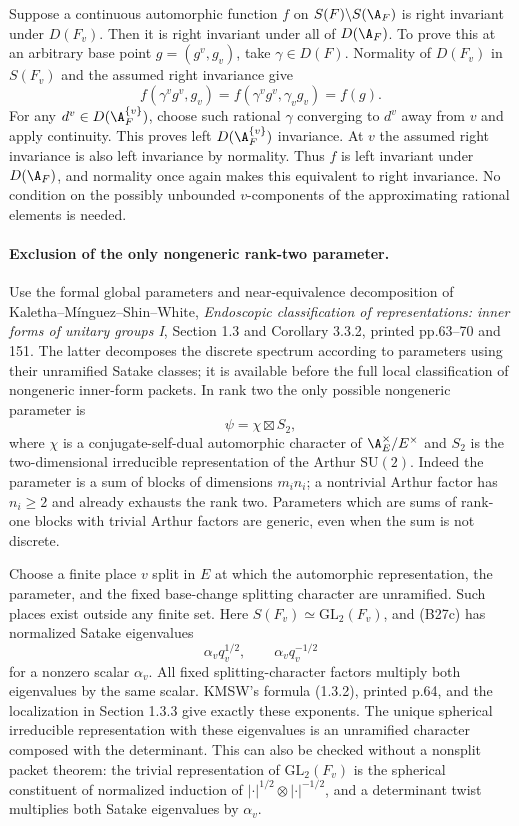 \documentclass[11pt]{article}
\theoremstyle{definition}\newtheorem{definition}[theorem]{Definition}\newtheorem{remark}[theorem]{Remark}
\begin{document}
Suppose a continuous automorphic function $f$ on $S(F)\backslash
S(\A_F)$ is right invariant under $D(F_v)$.  Then it is right
invariant under all of $D(\A_F)$.  To prove this at an arbitrary
base point $g=(g^v,g_v)$, take $\gamma\in D(F)$.  Normality of
$D(F_v)$ in $S(F_v)$ and the assumed right invariance give
\[
 f(\gamma^v g^v,g_v)
   =f(\gamma^v g^v,\gamma_v g_v)=f(g).
 \tag{B27b}
\]
For any $d^v\in D(\A_F^{\{v\}})$, choose such rational
$\gamma$ converging to $d^v$ away from $v$ and apply continuity.
This proves left $D(\A_F^{\{v\}})$ invariance.  At $v$ the
assumed right invariance is also left invariance by normality.
Thus $f$ is left invariant under $D(\A_F)$, and normality once
again makes this equivalent to right invariance.  No condition
on the possibly unbounded $v$-components of the approximating
rational elements is needed.

\paragraph{Exclusion of the only nongeneric rank-two parameter.}
Use the formal global parameters and near-equivalence decomposition
of Kaletha--M\'inguez--Shin--White, \emph{Endoscopic classification
of representations: inner forms of unitary groups I},
Section 1.3 and Corollary 3.3.2, printed pp.63--70 and 151.
The latter decomposes the discrete spectrum according to
parameters using their unramified Satake classes; it is available
before the full local classification of nongeneric inner-form
packets.  In rank two the only possible nongeneric parameter is
\[
                         \psi=\chi\boxtimes S_2,
 \tag{B27c}
\]
where $\chi$ is a conjugate-self-dual automorphic character of
$\A_E^\times/E^\times$ and $S_2$ is the two-dimensional
irreducible representation of the Arthur $\mathrm{SU}(2)$.
Indeed the parameter is a sum of blocks of dimensions
$m_i n_i$; a nontrivial Arthur factor has $n_i\ge2$ and
already exhausts the rank two.  Parameters which are sums
of rank-one blocks with trivial Arthur factors are generic,
even when the sum is not discrete.

Choose a finite place $v$ split in $E$ at which the automorphic
representation, the parameter, and the fixed base-change splitting
character are unramified.  Such places exist outside any finite
set.  Here $S(F_v)\simeq\mathrm{GL}_2(F_v)$, and (B27c)
has normalized Satake eigenvalues
\[
              \alpha_v q_v^{1/2},\qquad
              \alpha_v q_v^{-1/2}
 \tag{B27d}
\]
for a nonzero scalar $\alpha_v$.  All fixed splitting-character
factors multiply both eigenvalues by the same scalar.  KMSW's
formula (1.3.2), printed p.64, and the localization in
Section 1.3.3 give exactly these exponents.  The unique spherical
irreducible representation with these eigenvalues is an
unramified character composed with the determinant.  This can
also be checked without a nonsplit packet theorem: the trivial
representation of $\mathrm{GL}_2(F_v)$ is the spherical
constituent of normalized induction of
$|\cdot|^{1/2}\otimes|\cdot|^{-1/2}$, and a determinant twist
multiplies both Satake eigenvalues by $\alpha_v$.
\end{document}

